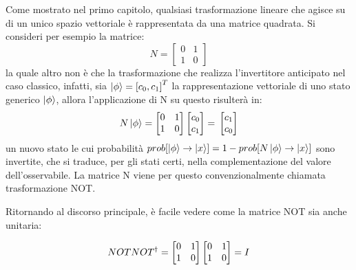 \documentclass[12pt,a4paper,openright]{report}
\begin{document}
Come mostrato nel primo capitolo, qualsiasi trasformazione lineare che agisce su di un unico spazio vettoriale è rappresentata da una matrice quadrata. Si consideri per esempio la matrice:
\[
   N = \begin{bmatrix}
        0 & 1 \\
        1 & 0
    \end{bmatrix}
\]
la quale altro non è che la trasformazione che realizza l'invertitore anticipato nel caso classico, infatti, sia $\ket{\phi} = {[c_0, c_1]}^T$ 
la rappresentazione vettoriale di uno stato generico $\ket{\phi}$, allora l'applicazione di N su questo risulterà in: 
\[
    N\ket{\phi}=
    \begin{bmatrix}
        0 & 1 \\
        1 & 0
    \end{bmatrix}
    \begin{bmatrix}
        c_0 \\ c_1
    \end{bmatrix}=\\
    \begin{bmatrix}
        c_1 \\
        c_0
    \end{bmatrix}
\]
un nuovo stato le cui probabilità $prob[\ket{\phi} \rightarrow \ket{x}] = 1 - prob[N\ket{\phi} \rightarrow \ket{x}]$ sono invertite,
che si traduce, per gli stati certi, nella complementazione del valore dell'osservabile. La matrice N viene per questo convenzionalmente chiamata trasformazione NOT.\par
Ritornando al discorso principale, è facile vedere come la matrice NOT sia anche unitaria:

\[
    NOTNOT^{\dag} = 
    \begin{bmatrix}
        0 & 1 \\
        1 & 0
    \end{bmatrix}
    \begin{bmatrix}
        0 & 1 \\
        1 & 0
    \end{bmatrix}=\\
    I
\]
\par
\end{document}
